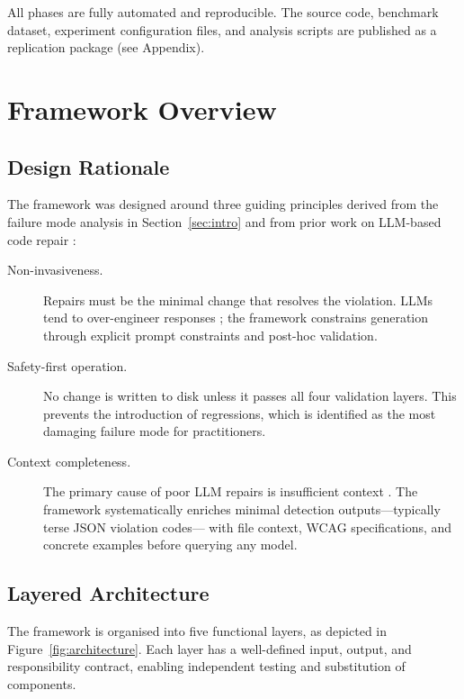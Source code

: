\noindent
All phases are fully automated and reproducible.  The source code, benchmark
dataset, experiment configuration files, and analysis scripts are published
as a replication package (see Appendix).

\section{Framework Overview}
\label{sec:overview}

\subsection{Design Rationale}

The framework was designed around three guiding principles derived from the
failure mode analysis in Section~\ref{sec:intro} and from prior work on
LLM-based code repair \cite{xia2023,chen2023llm}:

\begin{description}
  \item[Non-invasiveness.] Repairs must be the minimal change that resolves
    the violation.  LLMs tend to over-engineer responses \cite{chen2023llm};
    the framework constrains generation through explicit prompt constraints and
    post-hoc validation.
  \item[Safety-first operation.] No change is written to disk unless it passes
    all four validation layers.  This prevents the introduction of regressions,
    which is identified as the most damaging failure mode for practitioners.
  \item[Context completeness.] The primary cause of poor LLM repairs is
    insufficient context \cite{xia2023}.  The framework systematically
    enriches minimal detection outputs—typically terse JSON violation codes—
    with file context, WCAG specifications, and concrete examples before
    querying any model.
\end{description}

\subsection{Layered Architecture}

The framework is organised into five functional layers, as depicted in
Figure~\ref{fig:architecture}.  Each layer has a well-defined input, output,
and responsibility contract, enabling independent testing and substitution of
components.

